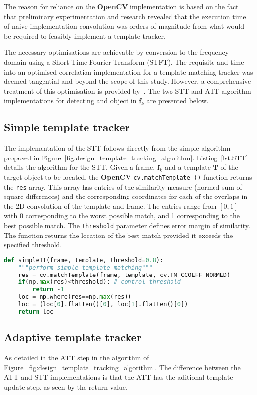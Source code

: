 The reason for reliance on the \textbf{OpenCV} implementation is based on the fact that
preliminary experimentation and research revealed that the execution time of
naive implementation convolution was orders of magnitude from what would be
required to feasibly implement a template tracker. 

The necessary optimisations are achievable by conversion to the frequency domain using a
Short-Time Fourier Transform (STFT). The requisite and time into an optimised
correlation implementation for a template matching tracker was deemed tangential
and beyond the scope of this study. However, a comprehensive treatment of this
optimisation is provided by~\cite{Usevitch2010}. The two STT and ATT algorithm
implementations for detecting and object in $\mathbf{f}_k$ are presented below.

\subsection{Simple template tracker}
The implementation of the STT follows directly from the simple algorithm
proposed in Figure~\ref{fig:design_template_tracking_algorithm}.
Listing~\ref{lst:STT} details the algorithm for the STT\@. Given a frame,
$\mathbf{f}_k$ and a
template $\mathbf{T}$ of the target object to be located, the \textbf{OpenCV} \lstinline{cv.matchTemplate ()} function
returns the \lstinline{res} array. This array has entries of the similarity
measure (normed sum of square differences) and the
corresponding coordinates for each of the overlaps in the 2D convolution of the
template and frame. The entries range from $\left[ 0,1 \right]$ with 0
corresponding to the worst possible match, and 1 corresponding to the best
possible match. The \lstinline{threshold} parameter defines error margin of
similarity. 
The function returns the location of the best match provided it exceeds the
specified threshold.

\begin{lstlisting}[language=Python, caption={STT tracking loop}, captionpos=b, label={lst:STT}]
def simpleTT(frame, template, threshold=0.8):
    """perform simple template matching"""
    res = cv.matchTemplate(frame, template, cv.TM_CCOEFF_NORMED)
    if(np.max(res)<threshold): # control threshold
        return -1
    loc = np.where(res==np.max(res))
    loc = (loc[0].flatten()[0], loc[1].flatten()[0])        
    return loc
\end{lstlisting}

\subsection{Adaptive template tracker}
As detailed in the ATT step in the algorithm of Figure~\ref{fig:design_template_tracking_algorithm}.
The difference between the ATT and STT implementations is that the ATT has the
aditional template update step, as seen by the return value.

